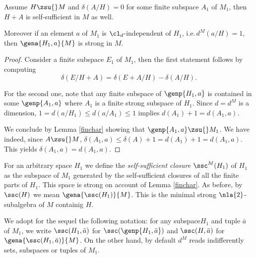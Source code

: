 \begin{lem}\label{samedelta2}
Assume $H\zsu{} M$ and $\delta(A/H)=0$ for some finite subspace $A_{1}$ of $M_{1}$, then $H+A$ is %
self-sufficient in $M$ as well.

Moreover if an element $a$ of $M_{1}$ is $\cl_{d}$-independent of $H_{1}$, i.{}e.\,$d^{M}(a/H)=1$, then
$\gena{H_{1},a}{M}$ is strong in $M$.
\end{lem}

\begin{proof}
Consider a finite subspace $E_{1}$ of $M_{1}$, then the first statement follows by computing
$$\delta(E/H+A)=\delta(E+A/H)-\delta(A/H).$$

For the second one, note that any finite subspace of $\genp{H_{1},a}$ is
contained in some $\genp{A_{1},a}$ where $A_{1}$ is a finite strong subspace of $H_{1}$.
Since $d=d^{M}$ is a dimension, $1=d(a/H_{1})\leq d(a/A_{1})\leq1$ implies
$d(A_{1})+1=d(A_{1},a)$.

We conclude by Lemma \ref{finchar} showing that $\genp{A_{1},a}\zsu{}M_{1}$.
We have indeed, since $A\zsu{}M$, $\delta(A_{1},a)\leq\delta(A)+1=d(A_{1})+1=d(A_{1},a)$.
This yields $\delta(A_{1},a)=d(A_{1},a)$.
\end{proof}

\bigskip
For an arbitrary space $H_{1}$ we
define the {\em self-sufficient closure} $\ssc^{M}(H_{1})$ of $H_{1}$ as the subspace of $M_{1}$ generated by the
self-sufficient closures of all the finite parts of $H_{1}$. This space is strong on account of Lemma \ref{finchar}.
As before, by $\ssc(H)$ we mean $\gena{\ssc(H_{1})}{M}$. This is the minimal strong $\nla{2}$-subalgebra of $M$
containig $H$.

\smallskip
We adopt for the sequel the following notation: for any subspace$H_{1}$ and tuple $\bar a$ of $M_{1}$, we write
$\ssc(H_{1},\bar a)$ for $\ssc(\genp{H_{1},\bar a})$ and $\ssc(H,\bar a)$ for $\gena{\ssc(H_{1},\bar a)}{M}$.
On the other hand, by default $d^{M}$ reads indifferently sets, subspaces or tuples of $M_{1}$.

